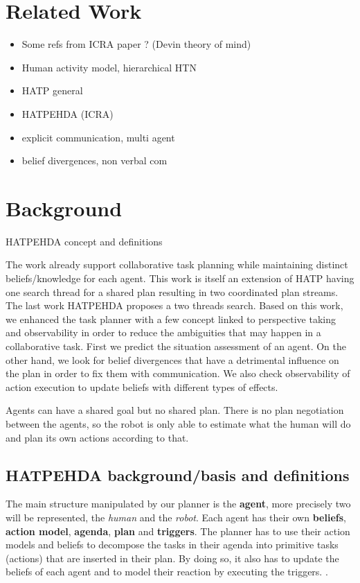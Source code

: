\documentclass[letterpaper]{article} %
\begin{document}
\section{Related Work}

\begin{itemize}
    \item Some refs from ICRA paper ? (Devin theory of mind) 
    \item Human activity model, hierarchical HTN
    \item HATP general
    \item HATPEHDA (ICRA)
    \item explicit communication, multi agent 
    \item belief divergences, non verbal com
\end{itemize}

\section{Background}
HATPEHDA concept and definitions

The work \cite{buisan:hal-03684211} already support collaborative task planning while maintaining distinct beliefs/knowledge for each agent. This work is itself an extension of HATP \cite{hatp?} having one search thread for a shared plan resulting in two coordinated plan streams. The last work HATPEHDA proposes a two threads search. Based on this work, we enhanced the task planner with a few concept linked to perspective taking and observability in order to reduce the ambiguities that may happen in a collaborative task. First we predict the situation assessment of an agent. On the other hand, we look for belief divergences that have a detrimental influence on the plan in order to fix them with communication. We also check observability of action execution to update beliefs with different types of effects.

Agents can have a shared goal but no shared plan. There is no plan negotiation between the agents, so the robot is only able to estimate what the human will do and plan its own actions according to that.

\subsection{HATPEHDA background/basis and definitions}

The main structure manipulated by our planner is the \textbf{agent}, more precisely two will be represented, the \textit{human} and the \textit{robot}. Each agent has their own \textbf{beliefs}, \textbf{action model}, \textbf{agenda}, \textbf{plan} and \textbf{triggers}. The planner has to use their action models and beliefs to decompose the tasks in their agenda into primitive tasks (actions) that are inserted in their plan. By doing so, it also has to update the beliefs of each agent and to model their reaction by executing the triggers. \cite{buisan:hal-03684211}.
\end{document}
